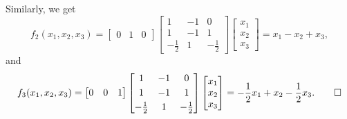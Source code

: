 \begin{solution}
  Similarly, we get
  \begin{equation*}
    f_2(x_1,x_2,x_3) =
    \begin{bmatrix}
      0 & 1 & 0
    \end{bmatrix}
    \begin{bmatrix}
      1 & -1 & 0 \\[3pt]
      1 & -1 & 1 \\[3pt]
      -\frac12 & 1 & -\frac12
    \end{bmatrix}
    \begin{bmatrix}
      x_1 \\ x_2 \\ x_3
    \end{bmatrix}
    = x_1 - x_2 + x_3,
  \end{equation*}
  and
  \begin{equation*}
    f_3(x_1,x_2,x_3) =
    \begin{bmatrix}
      0 & 0 & 1
    \end{bmatrix}
    \begin{bmatrix}
      1 & -1 & 0 \\[3pt]
      1 & -1 & 1 \\[3pt]
      -\frac12 & 1 & -\frac12
    \end{bmatrix}
    \begin{bmatrix}
      x_1 \\ x_2 \\ x_3
    \end{bmatrix}
    = -\frac12x_1 + x_2 - \frac12x_3.
    \qedhere
  \end{equation*}
\end{solution}
